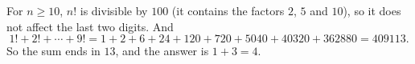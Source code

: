 For $n\ge10$, $n!$ is divisible by $100$ (it contains the factors $2$, $5$ and $10$), so it does not affect the last two digits. And
\[1!+2!+\cdots+9!=1+2+6+24+120+720+5040+40320+362880=409113.\]
So the sum ends in $13$, and the answer is $1+3=\boxed{4}$.
